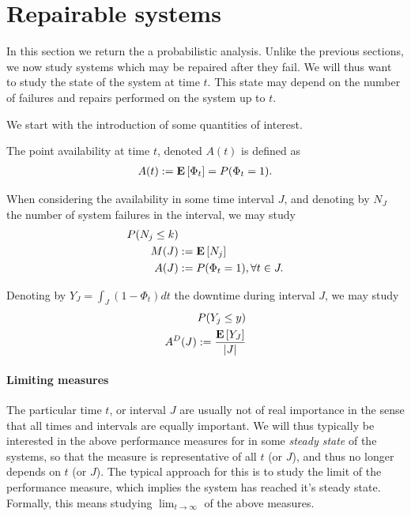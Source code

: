 \section{Repairable systems}
In this section we return the a probabilistic analysis.
Unlike the previous sections, we now study systems which may be repaired after they fail.
We will thus want to study the state of the system at time $t$.
This state may depend on the number of failures and repairs performed on the system up to $t$.

We start with the introduction of some quantities of interest.
\begin{definition}
The point availability at time $t$, denoted $A(t)$ is defined as 
\begin{align}
	A(t):= \mathbf{E}\left[ \Phi_t \right]=P(\Phi_t=1) .
\end{align}
\end{definition}

\begin{definition}
When considering the availability in some time interval $J$, and denoting by $N_J$ the number of system failures in the interval, we may study
\begin{align}
	P(N_j\leq k) &\\
	M(J) &:= \mathbf{E}\left[ N_j \right] \\
	A(J) &:= P(\Phi_t=1), \forall t \in J.
\end{align}
\end{definition}


\begin{definition}
Denoting by $Y_J=\int_J (1-\Phi_t) dt$ the downtime during interval $J$, we may study
\begin{align}
	P(Y_j \leq y) &	\\
	A^D(J) := \frac{\mathbf{E}\left[ Y_J \right]}{|J|}
\end{align}
\end{definition}

\paragraph{Limiting measures} The particular time $t$, or interval $J$ are usually not of real importance in the sense that all times and intervals are equally important.
We will thus typically be interested in the above performance measures for in some \emph{steady state} of the systems, so that the measure is representative of all $t$ (or $J$), and thus no longer depends on $t$ (or $J$).
The typical approach for this is to study the limit of the performance measure, which implies the system has reached it's steady state. Formally, this means studying $\lim_{t \to \infty}$ of the above measures. 


